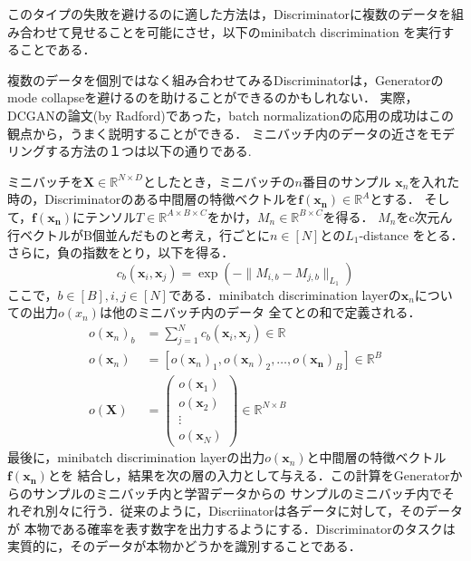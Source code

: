 \documentclass[uplatex, dvipdfmx]{jsarticle}
\theoremstyle{definition}
\begin{document}
    このタイプの失敗を避けるのに適した方法は，Discriminatorに複数のデータを組み合わせて見せることを可能にさせ，以下のminibatch discrimination
    を実行することである．

    複数のデータを個別ではなく組み合わせてみるDiscriminatorは，Generatorのmode collapseを避けるのを助けることができるのかもしれない．
    実際，DCGANの論文(by Radford)であった，batch normalizationの応用の成功はこの観点から，うまく説明することができる．
    ミニバッチ内のデータの近さをモデリングする方法の１つは以下の通りである.

    ミニバッチを$\bm{X} \in \mathbb{R}^{N \times D}$としたとき，ミニバッチの$n$番目のサンプル
    $\bm{x}_n$を入れた時の，Discriminatorのある中間層の特徴ベクトルを$\bm{f}(\bm{x_n}) \in \mathbb{R}^{A}$とする．
    そして，$\bm{f}(\bm{x_n})$にテンソル$T \in \mathbb{R}^{A \times B \times C}$をかけ，$M_n \in \mathbb{R}^{B \times C}$を得る．
    $M_n$をc次元ん行ベクトルがB個並んだものと考え，行ごとに$n \in [N]$との$L_1$-distance をとる．
    さらに，負の指数をとり，以下を得る．
    \begin{equation}
        c_b(\bm{x}_i, \bm{x}_j) = \exp\left(- \| M_{i, b} - M_{j, b} \|_{L_1} \right)
    \end{equation}
    ここで，$b \in [B], i, j \in [N]$である．minibatch discrimination layerの$\bm{x}_n$についての出力$o(x_n)$は他のミニバッチ内のデータ
    全てとの和で定義される．
    \begin{align}
        o(\bm{x}_n)_b &= \sum_{j=1}^N c_b(\bm{x}_i, \bm{x}_j) \in \mathbb{R} \\
        o(\bm{x}_n) &= \left[ o(\bm{x}_n)_1, o(\bm{x}_n)_2, \dots, o(\bm{x_n})_B \right] \in \mathbb{R}^{B} \\[6pt]
        o(\bm{X})  &= \begin{pmatrix}
            o(\bm{x}_1) \\[2pt]
            o(\bm{x}_2) \\[2pt]
            \vdots \\[2pt]
            o(\bm{x}_N)
        \end{pmatrix}\in \mathbb{R}^{N \times B}
    \end{align}
    最後に，minibatch discrimination layerの出力$o(\bm{x}_n)$と中間層の特徴ベクトル$\bm{f}(\bm{x_n})$とを
    結合し，結果を次の層の入力として与える．この計算をGeneratorからのサンプルのミニバッチ内と学習データからの
    サンプルのミニバッチ内でそれぞれ別々に行う．従来のように，Discriinatorは各データに対して，そのデータが
    本物である確率を表す数字を出力するようにする．Discriminatorのタスクは実質的に，そのデータが本物かどうかを識別することである．
\end{document}

